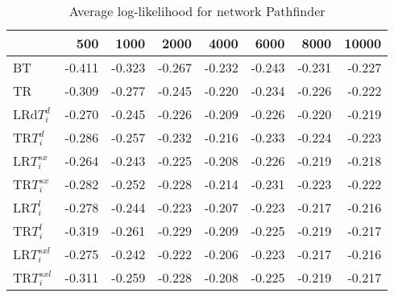\begin{table}
 \begin{center}
 \begin{tabular}{lrrrrrrr}
& 500 &  1000 & 2000 & 4000 & 6000& 8000&  10000\\\hline
BT & -0.411 & -0.323 & -0.267 & -0.232 & -0.243 & -0.231 & -0.227\\\hline
TR & -0.309 & -0.277 & -0.245 & -0.220 & -0.234 & -0.226 & -0.222\\\hline
LRd$T_i^d$ & -0.270 & -0.245 & -0.226 & -0.209 & -0.226 & -0.220 & -0.219\\\hline
TR$T_i^d$ & -0.286 & -0.257 & -0.232 & -0.216 & -0.233 & -0.224 & -0.223\\\hline
LR$T_i^{sx}$ & -0.264 & -0.243 & -0.225 & -0.208 & -0.226 & -0.219 & -0.218\\\hline
TR$T_i^{sx}$ & -0.282 & -0.252 & -0.228 & -0.214 & -0.231 & -0.223 & -0.222\\\hline
LR$T_i^l$ & -0.278 & -0.244 & -0.223 & -0.207 & -0.223 & -0.217 & -0.216\\\hline
TR$T_i^l$ & -0.319 & -0.261 & -0.229 & -0.209 & -0.225 & -0.219 & -0.217\\\hline
LR$T_i^{sxl}$ & -0.275 & -0.242 & -0.222 & -0.206 & -0.223 & -0.217 & -0.216\\\hline
TR$T_i^{sxl}$ & -0.311 & -0.259 & -0.228 & -0.208 & -0.225 & -0.219 & -0.217\\\hline
\end{tabular}
\end{center}
\caption{Average log-likelihood for network Pathfinder }
\label{Pathfinderll}
\end{table}


